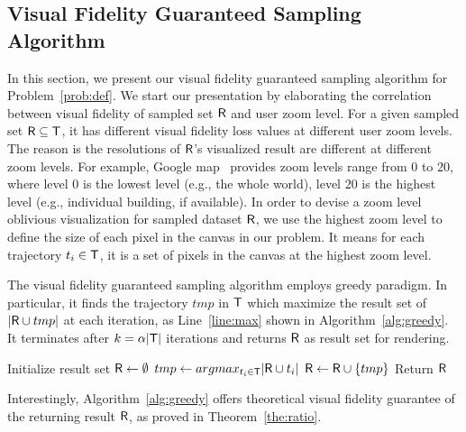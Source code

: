 \subsection{Visual Fidelity Guaranteed Sampling Algorithm}\label{sec:greedy}
In this section, we present our visual fidelity guaranteed sampling algorithm for Problem~\ref{prob:def}.
We start our presentation by elaborating the correlation between visual fidelity of sampled set $\mathsf{R}$ and user zoom level.
For a given sampled set $\mathsf{R} \subseteq \mathsf{T}$, it has different visual fidelity loss values at different user zoom levels.
The reason is the resolutions of $\mathsf{R}$'s visualized result are different at different zoom levels.
For example, Google map~\cite{googlemap} provides zoom levels range from 0 to 20,
where level 0 is the lowest level (e.g., the whole world), level 20 is the highest level (e.g., individual building, if available).
In order to devise a zoom level oblivious visualization for sampled dataset $\mathsf{R}$,
we use the highest zoom level to define the size of each pixel in the canvas in our problem.
It means for each trajectory $t_i \in \mathsf{T}$, it is a set of pixels in the canvas at the highest zoom level.

The visual fidelity guaranteed sampling algorithm employs greedy paradigm.
In particular, it finds the trajectory $tmp$ in $\mathsf{T}$ which maximize the result set of $|\mathsf{R} \cup tmp|$ at each iteration, as Line~\ref{line:max} shown in Algorithm~\ref{alg:greedy}.
It terminates after $k=\alpha |\mathsf{T}|$ iterations and returns $\mathsf{R}$ as result set for rendering.

\vspace{-2mm}
\begin{algorithm}
    \caption{$\vats(\D,k=\alpha |\D|)$} \label{alg:greedy}
    \begin{algorithmic}[1]
    \State Initialize result set $\mathsf{R} \leftarrow \emptyset$
        \State $tmp \leftarrow argmax_{t_i \in \mathsf{T}} |\mathsf{R} \cup t_i|$ \label{line:max}
        \State $\mathsf{R} \leftarrow \mathsf{R} \cup \{ tmp \}$
    \EndWhile
    \State Return $\mathsf{R}$
    \end{algorithmic}
\end{algorithm}
\vspace{-2mm}

Interestingly, Algorithm~\ref{alg:greedy} offers theoretical visual fidelity guarantee of the returning result $\mathsf{R}$, as proved in Theorem~\ref{the:ratio}.

